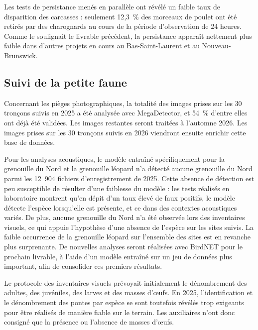Les tests de persistance menés en parallèle ont révélé un faible taux de disparition des carcasses : seulement 12,3~\% des morceaux de poulet ont été retirés par des charognards au cours de la période d'observation de 24 heures. Comme le soulignait le livrable précédent, la persistance apparaît nettement plus faible dans d'autres projets en cours au Bas-Saint-Laurent et au Nouveau-Brunswick.

\subsection{Suivi de la petite faune}

Concernant les pièges photographiques, la totalité des images prises sur les 30 tronçons suivis en 2025 a été analysée avec MegaDetector, et 54~\% d'entre elles ont déjà été validées. Les images restantes seront traitées à l'automne 2026. Les images prises sur les 30 tronçons suivis en 2026 viendront ensuite enrichir cette base de données.

Pour les analyses acoustiques, le modèle entraîné spécifiquement pour la grenouille du Nord et la grenouille léopard n'a détecté aucune grenouille du Nord parmi les 12~904 fichiers d'enregistrement de 2025. Cette absence de détection est peu susceptible de résulter d'une faiblesse du modèle : les tests réalisés en laboratoire montrent qu'en dépit d'un taux élevé de faux positifs, le modèle détecte l'espèce lorsqu'elle est présente, et ce dans des contextes acoustiques variés. De plus, aucune grenouille du Nord n'a été observée lors des inventaires visuels, ce qui appuie l'hypothèse d'une absence de l'espèce sur les sites suivis. La faible occurrence de la grenouille léopard sur l'ensemble des sites est en revanche plus surprenante. De nouvelles analyses seront réalisées avec BirdNET pour le prochain livrable, à l'aide d'un modèle entraîné sur un jeu de données plus important, afin de consolider ces premiers résultats.

Le protocole des inventaires visuels prévoyait initialement le dénombrement des adultes, des juvéniles, des larves et des masses d'\oe{}ufs. En 2025, l'identification et le dénombrement des pontes par espèce se sont toutefois révélés trop exigeants pour être réalisés de manière fiable sur le terrain. Les auxiliaires n'ont donc consigné que la présence ou l'absence de masses d'\oe{}ufs.

